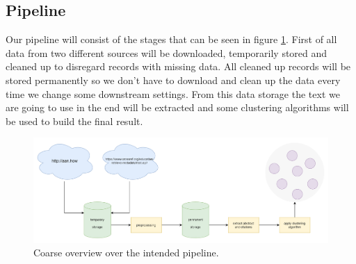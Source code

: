\subsection{Pipeline}

Our pipeline will consist of the stages that can be seen in figure \ref{fig:pipeline}. First of all data from two different sources will be downloaded, temporarily stored and cleaned up to disregard records with missing data.
All cleaned up records will be stored permanently so we don't have to download and clean up the data every time we change some downstream settings. From this data storage the text we are going to use in the end will be extracted and some clustering algorithms will be used to build the final result.

\begin{figure}[ht]
    \centering
    \includegraphics[width=\textwidth,keepaspectratio]{figures/pipeline}
    \caption[]{Coarse overview over the intended pipeline.}
    \label{fig:pipeline}
\end{figure}

